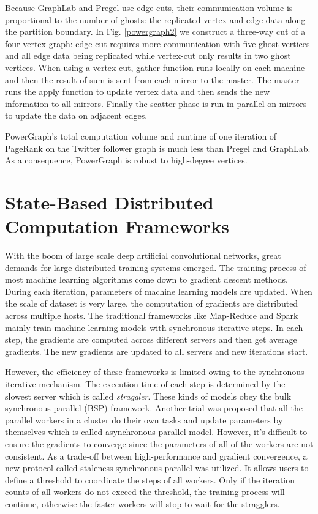 \documentclass[journal]{IEEEtran}
\begin{document}
Because GraphLab and Pregel use edge-cuts, their communication volume is proportional to the number of ghosts: the replicated vertex and edge data along the partition boundary. In Fig. \ref{powergraph2} we construct a three-way cut of a four vertex graph: edge-cut requires more communication with five ghost vertices and all edge data being replicated while vertex-cut only results in two ghost vertices. When using a vertex-cut, gather function runs locally on each machine and then the result of sum is sent from each mirror to the master. The master runs the apply function to update vertex data and then sends the new information to all mirrors. Finally the scatter phase is run in parallel on mirrors to update the data on adjacent edges\cite{PowerGraph}.

PowerGraph’s total computation volume and runtime of one iteration of PageRank on the Twitter follower graph is much less than Pregel and GraphLab. As a consequence, PowerGraph is robust to high-degree vertices.

\section{State-Based Distributed Computation Frameworks}
With the boom of large scale deep artificial convolutional networks, great demands for large distributed training systems emerged. The training process of most machine learning algorithms come down to gradient descent methods. During each iteration, parameters of machine learning models are updated. When the scale of dataset is very large, the computation of gradients are distributed across multiple hosts. The traditional frameworks like Map-Reduce and Spark mainly train machine learning models with synchronous iterative steps. In each step, the gradients are computed across different servers and then get average gradients. The new gradients are updated to all servers and new iterations start. 

However, the efficiency of these frameworks is limited owing to the synchronous iterative mechanism. The execution time of each step is determined by the slowest server which is called \textit{straggler}. These kinds of models obey the bulk synchronous parallel (BSP) \cite{valiant1990bridging} framework. Another trial was proposed that all the parallel workers in a cluster do their own tasks and update parameters by themselves which is called asynchronous parallel model. However, it's difficult to ensure the gradients to converge since the parameters of all of the workers are not consistent. As a trade-off between high-performance and gradient convergence, a new protocol called staleness synchronous parallel was utilized. It allows users to define a threshold to coordinate the steps of all workers. Only if the iteration counts of all workers do not exceed the threshold, the training process will continue, otherwise the faster workers will stop to wait for the stragglers.
\end{document}
